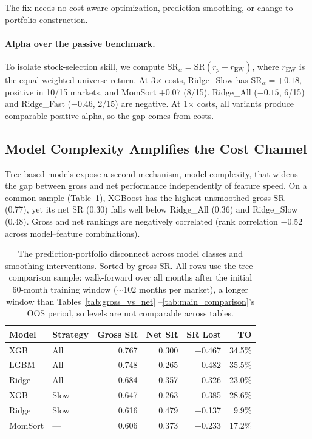 \documentclass[sigconf,balance=false]{acmart}
\begin{document}
The fix needs no cost-aware optimization, prediction smoothing, or
change to portfolio construction.

\paragraph{Alpha over the passive benchmark.}
To isolate stock-selection skill, we compute $\text{SR}_\alpha =
\text{SR}(r_p - r_{\text{EW}})$, where $r_{\text{EW}}$ is the
equal-weighted universe return. At 3$\times$ costs, Ridge\_Slow has
$\text{SR}_\alpha = +0.18$, positive in 10/15 markets, and MomSort
$+0.07$ (8/15). Ridge\_All ($-0.15$, 6/15) and Ridge\_Fast ($-0.46$,
2/15) are negative. At
1$\times$ costs, all variants produce comparable positive alpha, so
the gap comes from costs.


\subsection{Model Complexity Amplifies the Cost Channel}
\label{sec:tree_inversion}

Tree-based models expose a second mechanism, model complexity, that
widens the gap between gross and net performance independently of
feature speed. On a common sample (Table~\ref{tab:tree_inversion}),
XGBoost has the highest unsmoothed gross SR (0.77), yet its net SR
(0.30) falls well below Ridge\_All (0.36) and Ridge\_Slow (0.48).
Gross and net rankings are negatively correlated (rank correlation
$-$0.52 across model--feature combinations).

\begin{table}[t]
\centering
\caption{The prediction-portfolio disconnect across model classes and
smoothing interventions. Sorted by gross SR. All rows use the
tree-comparison sample: walk-forward over all
months after the initial 60-month training window (${\sim}$102 months
per market), a longer window than Tables~\ref{tab:gross_vs_net}%
--\ref{tab:main_comparison}'s OOS period, so levels are not comparable
across tables.}
\label{tab:tree_inversion}
\small
\begin{tabular}{@{}llrrrr@{}}
\toprule
Model & Strategy & Gross SR & Net SR & SR Lost & TO \\
\midrule
XGB   & All          & 0.767 & 0.300 & $-$0.467 & 34.5\% \\
LGBM  & All          & 0.748 & 0.265 & $-$0.482 & 35.5\% \\
Ridge & All          & 0.684 & 0.357 & $-$0.326 & 23.0\% \\
XGB   & Slow         & 0.647 & 0.263 & $-$0.385 & 28.6\% \\
Ridge & Slow         & 0.616 & 0.479 & $-$0.137 & 9.9\% \\
MomSort & ---        & 0.606 & 0.373 & $-$0.233 & 17.2\% \\
\bottomrule
\end{tabular}
\end{table}
\end{document}
